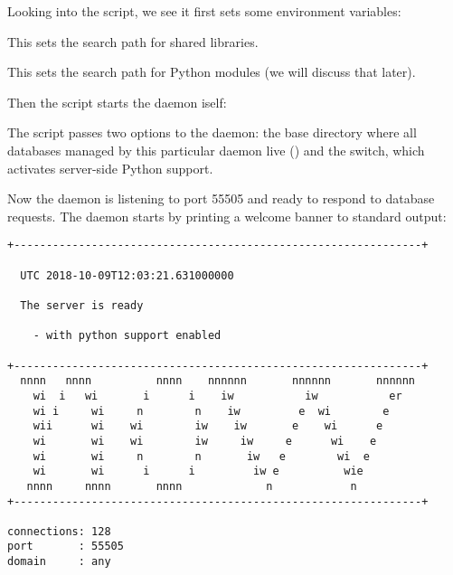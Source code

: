 Looking into the script,
we see it first sets some environment variables:


This sets the search path for shared libraries.


This sets the search path for Python modules
(we will discuss that later).

Then the script starts the daemon iself:


The script passes two options to the daemon:
the base directory where all databases
managed by this particular daemon live ()
and the  switch, which activates
server-side Python support.

Now the daemon is listening to port 55505
and ready to respond to database requests.
The daemon starts by printing a welcome banner
to standard output:

\begingroup
\small
\begin{minipage}{\textwidth}
\begin{verbatim}
+---------------------------------------------------------------+ 
 
  UTC 2018-10-09T12:03:21.631000000
 
  The server is ready
 
    - with python support enabled
 
+---------------------------------------------------------------+ 
  nnnn   nnnn          nnnn    nnnnnn       nnnnnn       nnnnnn  
    wi  i   wi       i      i    iw           iw           er   
    wi i     wi     n        n    iw         e  wi        e    
    wii      wi    wi        iw    iw       e    wi      e        
    wi       wi    wi        iw     iw     e      wi    e        
    wi       wi     n        n       iw   e        wi  e        
    wi       wi      i      i         iw e          wie          
   nnnn     nnnn       nnnn             n            n            
+---------------------------------------------------------------+ 

connections: 128
port       : 55505
domain     : any
\end{verbatim}
\end{minipage}
\endgroup

